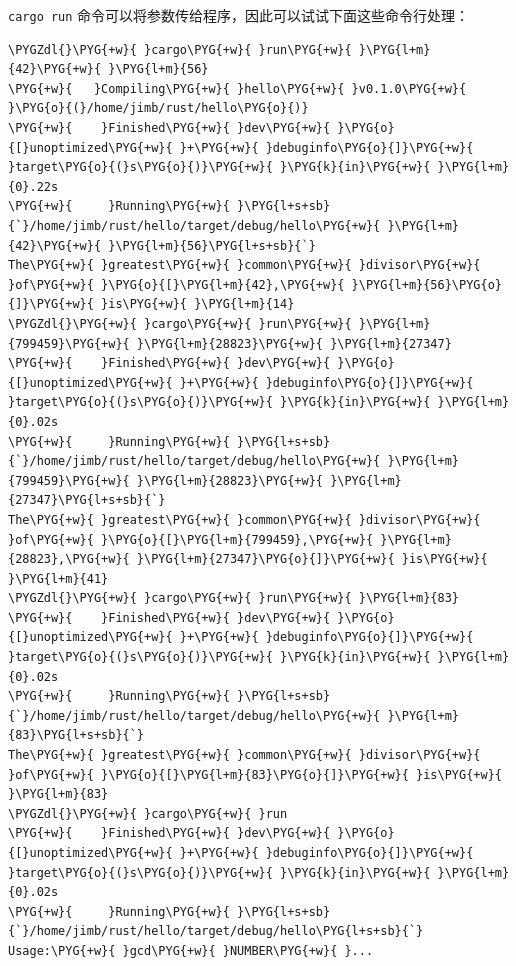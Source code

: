 \texttt{cargo run} 命令可以将参数传给程序，因此可以试试下面这些命令行处理：

\begin{Verbatim}[commandchars=\\\{\},breaklines=true,breakanywhere=true,fontsize=\codefont,xleftmargin=17bp]
\PYGZdl{}\PYG{+w}{ }cargo\PYG{+w}{ }run\PYG{+w}{ }\PYG{l+m}{42}\PYG{+w}{ }\PYG{l+m}{56}
\PYG{+w}{   }Compiling\PYG{+w}{ }hello\PYG{+w}{ }v0.1.0\PYG{+w}{ }\PYG{o}{(}/home/jimb/rust/hello\PYG{o}{)}
\PYG{+w}{    }Finished\PYG{+w}{ }dev\PYG{+w}{ }\PYG{o}{[}unoptimized\PYG{+w}{ }+\PYG{+w}{ }debuginfo\PYG{o}{]}\PYG{+w}{ }target\PYG{o}{(}s\PYG{o}{)}\PYG{+w}{ }\PYG{k}{in}\PYG{+w}{ }\PYG{l+m}{0}.22s
\PYG{+w}{     }Running\PYG{+w}{ }\PYG{l+s+sb}{`}/home/jimb/rust/hello/target/debug/hello\PYG{+w}{ }\PYG{l+m}{42}\PYG{+w}{ }\PYG{l+m}{56}\PYG{l+s+sb}{`}
The\PYG{+w}{ }greatest\PYG{+w}{ }common\PYG{+w}{ }divisor\PYG{+w}{ }of\PYG{+w}{ }\PYG{o}{[}\PYG{l+m}{42},\PYG{+w}{ }\PYG{l+m}{56}\PYG{o}{]}\PYG{+w}{ }is\PYG{+w}{ }\PYG{l+m}{14}
\PYGZdl{}\PYG{+w}{ }cargo\PYG{+w}{ }run\PYG{+w}{ }\PYG{l+m}{799459}\PYG{+w}{ }\PYG{l+m}{28823}\PYG{+w}{ }\PYG{l+m}{27347}
\PYG{+w}{    }Finished\PYG{+w}{ }dev\PYG{+w}{ }\PYG{o}{[}unoptimized\PYG{+w}{ }+\PYG{+w}{ }debuginfo\PYG{o}{]}\PYG{+w}{ }target\PYG{o}{(}s\PYG{o}{)}\PYG{+w}{ }\PYG{k}{in}\PYG{+w}{ }\PYG{l+m}{0}.02s
\PYG{+w}{     }Running\PYG{+w}{ }\PYG{l+s+sb}{`}/home/jimb/rust/hello/target/debug/hello\PYG{+w}{ }\PYG{l+m}{799459}\PYG{+w}{ }\PYG{l+m}{28823}\PYG{+w}{ }\PYG{l+m}{27347}\PYG{l+s+sb}{`}
The\PYG{+w}{ }greatest\PYG{+w}{ }common\PYG{+w}{ }divisor\PYG{+w}{ }of\PYG{+w}{ }\PYG{o}{[}\PYG{l+m}{799459},\PYG{+w}{ }\PYG{l+m}{28823},\PYG{+w}{ }\PYG{l+m}{27347}\PYG{o}{]}\PYG{+w}{ }is\PYG{+w}{ }\PYG{l+m}{41}
\PYGZdl{}\PYG{+w}{ }cargo\PYG{+w}{ }run\PYG{+w}{ }\PYG{l+m}{83}
\PYG{+w}{    }Finished\PYG{+w}{ }dev\PYG{+w}{ }\PYG{o}{[}unoptimized\PYG{+w}{ }+\PYG{+w}{ }debuginfo\PYG{o}{]}\PYG{+w}{ }target\PYG{o}{(}s\PYG{o}{)}\PYG{+w}{ }\PYG{k}{in}\PYG{+w}{ }\PYG{l+m}{0}.02s
\PYG{+w}{     }Running\PYG{+w}{ }\PYG{l+s+sb}{`}/home/jimb/rust/hello/target/debug/hello\PYG{+w}{ }\PYG{l+m}{83}\PYG{l+s+sb}{`}
The\PYG{+w}{ }greatest\PYG{+w}{ }common\PYG{+w}{ }divisor\PYG{+w}{ }of\PYG{+w}{ }\PYG{o}{[}\PYG{l+m}{83}\PYG{o}{]}\PYG{+w}{ }is\PYG{+w}{ }\PYG{l+m}{83}
\PYGZdl{}\PYG{+w}{ }cargo\PYG{+w}{ }run
\PYG{+w}{    }Finished\PYG{+w}{ }dev\PYG{+w}{ }\PYG{o}{[}unoptimized\PYG{+w}{ }+\PYG{+w}{ }debuginfo\PYG{o}{]}\PYG{+w}{ }target\PYG{o}{(}s\PYG{o}{)}\PYG{+w}{ }\PYG{k}{in}\PYG{+w}{ }\PYG{l+m}{0}.02s
\PYG{+w}{     }Running\PYG{+w}{ }\PYG{l+s+sb}{`}/home/jimb/rust/hello/target/debug/hello\PYG{l+s+sb}{`}
Usage:\PYG{+w}{ }gcd\PYG{+w}{ }NUMBER\PYG{+w}{ }...
\end{Verbatim}

